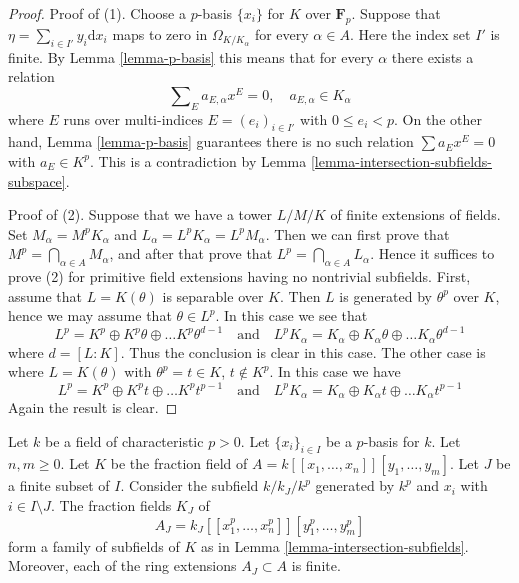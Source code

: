 \begin{proof}
Proof of (1).
Choose a $p$-basis $\{x_i\}$ for $K$ over $\mathbf{F}_p$.
Suppose that $\eta = \sum_{i \in I'} y_i \text{d}x_i$ maps to zero in
$\Omega_{K/K_\alpha}$ for every $\alpha \in A$. Here the index set
$I'$ is finite. By Lemma \ref{lemma-p-basis}
this means that for every $\alpha$ there exists a relation
$$
\sum\nolimits_E a_{E, \alpha} x^E = 0,\quad a_{E, \alpha} \in K_\alpha
$$
where $E$ runs over multi-indices $E = (e_i)_{i \in I'}$ with
$0 \leq e_i < p$. On the other hand, Lemma \ref{lemma-p-basis}
guarantees there is no such relation $\sum a_E x^E = 0$ with
$a_E \in K^p$. This is a contradiction by
Lemma \ref{lemma-intersection-subfields-subspace}.

\medskip\noindent
Proof of (2). Suppose that we have a tower $L/M/K$
of finite extensions of fields. Set $M_\alpha = M^p K_\alpha$
and $L_\alpha = L^p K_\alpha = L^p M_\alpha$. Then we can first prove that
$M^p = \bigcap_{\alpha \in A} M_\alpha$, and after that prove
that $L^p = \bigcap_{\alpha \in A} L_\alpha$. Hence it suffices to
prove (2) for primitive field extensions having no nontrivial subfields.
First, assume that $L = K(\theta)$ is separable over $K$. Then
$L$ is generated by $\theta^p$ over $K$, hence we may assume that
$\theta \in L^p$. In this case we see that
$$
L^p = K^p \oplus K^p\theta \oplus \ldots K^p\theta^{d - 1}
\quad\text{and}\quad
L^pK_\alpha =
K_\alpha \oplus K_\alpha \theta \oplus \ldots K_\alpha\theta^{d - 1}
$$
where $d = [L : K]$. Thus the conclusion is clear in this case. The other
case is where $L = K(\theta)$ with $\theta^p = t \in K$, $t \not \in K^p$.
In this case we have
$$
L^p = K^p \oplus K^pt \oplus \ldots K^pt^{p - 1}
\quad\text{and}\quad
L^pK_\alpha =
K_\alpha \oplus K_\alpha t \oplus \ldots K_\alpha t^{p - 1}
$$
Again the result is clear.
\end{proof}

\begin{lemma}
\label{lemma-power-series-ring-subfields}
Let $k$ be a field of characteristic $p > 0$. Let $\{x_i\}_{i \in I}$
be a $p$-basis for $k$. Let $n, m \geq 0$.
Let $K$ be the fraction field of $A = k[[x_1, \ldots, x_n]][y_1, \ldots, y_m]$.
Let $J$ be a finite subset of $I$. Consider the subfield
$k/k_J/k^p$ generated by $k^p$ and $x_i$ with $i \in I \setminus J$.
The fraction fields $K_J$ of
$$
A_J = k_J[[x_1^p, \ldots, x_n^p]][y_1^p, \ldots, y_m^p]
$$
form a family of subfields of $K$ as in
Lemma \ref{lemma-intersection-subfields}. Moreover, each of the ring extensions
$A_J \subset A$ is finite.
\end{lemma}

